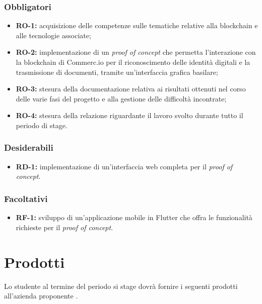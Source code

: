 \subsubsection*{Obbligatori}
\begin{itemize}
	\item \textbf{RO-1:} acquisizione delle competenze sulle tematiche relative alla blockchain e alle tecnologie associate;
	\item \textbf{RO-2:} implementazione di un \textit{proof of concept} che permetta l'interazione con la blockchain di Commerc.io per il riconoscimento delle identità digitali e la trasmissione di documenti, tramite un'interfaccia grafica basilare;
	\item \textbf{RO-3:} stesura della documentazione relativa ai risultati ottenuti nel corso delle varie fasi del progetto e alla gestione delle difficoltà incontrate;
	\item \textbf{RO-4:} stesura della relazione riguardante il lavoro svolto durante tutto il periodo di stage.
\end{itemize}

\subsubsection*{Desiderabili}
\begin{itemize}
	\item \textbf{RD-1:} implementazione di un'interfaccia web completa per il \textit{proof of concept}.
\end{itemize}

\subsubsection*{Facoltativi}
\begin{itemize}
	\item \textbf{RF-1:} sviluppo di un'applicazione mobile in Flutter che offra le funzionalità richieste per il \textit{proof of concept}.
\end{itemize} 


\section{Prodotti}

Lo studente al termine del periodo si stage dovrà fornire i seguenti prodotti all'azienda proponente \myCompany{} \companyTitle.
